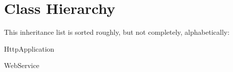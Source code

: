 \section{Class Hierarchy}
This inheritance list is sorted roughly, but not completely, alphabetically\+:\begin{DoxyCompactList}
\item Http\+Application\begin{DoxyCompactList}
\item {}
\end{DoxyCompactList}
\item Web\+Service\begin{DoxyCompactList}
\item {}
\end{DoxyCompactList}
\end{DoxyCompactList}

